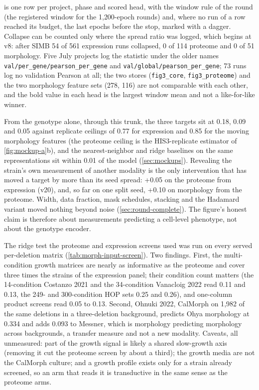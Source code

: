   is one row per project, phase and
scored head, with the window rule of the round (the registered window for the 1{,}200-epoch
rounds) and, where no run of a row reached its budget, the last epochs before the stop,
marked with a dagger. Collapse can be counted only where the spread ratio was logged, which
begins at v8: after SIMB 54 of 561 expression runs collapsed, 0 of 114 proteome and 0 of 51
morphology. Five July projects log the statistic under the older names
\texttt{val/per\_gene/pearson\_per\_gene} and \texttt{val/global/pearson\_per\_gene}; 73 runs
log no validation Pearson at all; the two stores (\texttt{fig3\_core},
\texttt{fig3\_proteome}) and the two morphology feature sets (278, 116) are not comparable
with each other, and the bold value in each head is the largest window mean and not a
like-for-like winner.



 From the genotype alone, through
this trunk, the three targets sit at 0.18, 0.09 and 0.05 against replicate ceilings of
0.77 for expression and 0.85 for the moving morphology features (the proteome ceiling is
the HIS3-replicate estimator of \cref{fig:mockup-a}b), and the nearest-neighbor and ridge
baselines on the same representations sit within 0.01 of the model (\cref{sec:mockups}). Revealing the strain's
own measurement of another modality is the only intervention that has moved a target by
more than its seed spread: +0.05 on the proteome from expression (v20), and, so far on one
split seed, +0.10 on morphology from the proteome. Width, data fraction, mask schedules,
stacking and the Hadamard variant moved nothing beyond noise (\cref{sec:round-complete}). The
figure's honest claim is therefore about measurements predicting a cell-level phenotype,
not about the genotype encoder.

 The ridge test the proteome and
expression screens used was run on every served per-deletion matrix
(\cref{tab:morph-input-screen}). Two findings. First, the multi-condition growth matrices
are nearly as informative as the proteome and cover three times the strains of the
expression panel; their condition count matters (the 14-condition Costanzo 2021 and the
34-condition Vanacloig 2022 read 0.11 and 0.13, the 249- and 300-condition HOP sets 0.25
and 0.26), and one-column product screens read 0.05 to 0.13. Second, Ohnuki 2022, CalMorph
on 1{,}982 of the same deletions in a three-deletion background, predicts Ohya morphology
at 0.334 and adds 0.093 to Messner, which is morphology predicting morphology across
backgrounds, a transfer measure and not a new modality. Caveats, all unmeasured: part of the growth signal
is likely a shared slow-growth axis (removing it cut the proteome screen by about a third);
the growth media are not the CalMorph culture; and a growth profile exists only for a strain
already screened, so an arm that reads it is transductive in the same sense as the
proteome arms.

